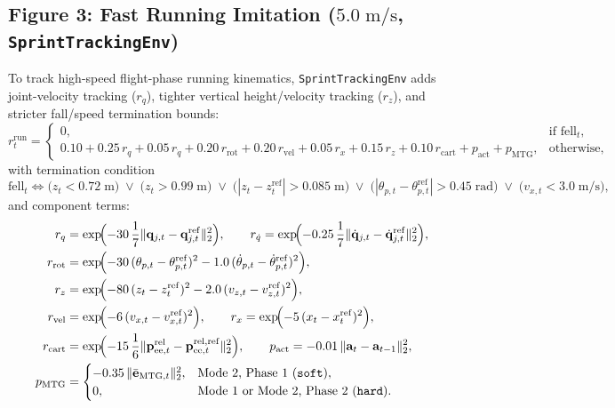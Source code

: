 \subsection*{Figure 3: Fast Running Imitation ($5.0\;\mathrm{m/s}$, \texttt{SprintTrackingEnv})}

To track high-speed flight-phase running kinematics, \texttt{SprintTrackingEnv} adds joint-velocity tracking ($r_{\dot{q}}$), tighter vertical height/velocity tracking ($r_z$), and stricter fall/speed termination bounds:
\begin{equation}
r_t^{\mathrm{run}} =
\begin{cases}
0, & \text{if } \mathrm{fell}_t, \\[6pt]
0.10 + 0.25\,r_q + 0.05\,r_{\dot{q}} + 0.20\,r_{\mathrm{rot}} + 0.20\,r_{\mathrm{vel}} + 0.05\,r_x + 0.15\,r_z + 0.10\,r_{\mathrm{cart}} + p_{\mathrm{act}} + p_{\mathrm{MTG}}, & \text{otherwise},
\end{cases}
\end{equation}
with termination condition
\begin{equation}
\mathrm{fell}_t \iff \bigl(z_t < 0.72\;\mathrm{m}\bigr) \;\lor\; \bigl(z_t > 0.99\;\mathrm{m}\bigr) \;\lor\; \bigl(|z_t - z_t^{\mathrm{ref}}| > 0.085\;\mathrm{m}\bigr) \;\lor\; \bigl(|\theta_{p,t} - \theta_{p,t}^{\mathrm{ref}}| > 0.45\;\mathrm{rad}\bigr) \;\lor\; \bigl(v_{x,t} < 3.0\;\mathrm{m/s}\bigr),
\end{equation}
and component terms:
\begin{align}
r_q &= \exp\!\Bigl(-30\,\frac{1}{7}\lVert \mathbf{q}_{j,t} - \mathbf{q}_{j,t}^{\mathrm{ref}} \rVert_2^2\Bigr), \qquad
r_{\dot{q}} = \exp\!\Bigl(-0.25\,\frac{1}{7}\lVert \dot{\mathbf{q}}_{j,t} - \dot{\mathbf{q}}_{j,t}^{\mathrm{ref}} \rVert_2^2\Bigr), \\
r_{\mathrm{rot}} &= \exp\!\Bigl(-30\,(\theta_{p,t} - \theta_{p,t}^{\mathrm{ref}})^2 - 1.0\,(\dot{\theta}_{p,t} - \dot{\theta}_{p,t}^{\mathrm{ref}})^2\Bigr), \\
r_z &= \exp\!\Bigl(-80\,(z_t - z_t^{\mathrm{ref}})^2 - 2.0\,(v_{z,t} - v_{z,t}^{\mathrm{ref}})^2\Bigr), \\
r_{\mathrm{vel}} &= \exp\!\Bigl(-6\,(v_{x,t} - v_{x,t}^{\mathrm{ref}})^2\Bigr), \qquad
r_x = \exp\!\Bigl(-5\,(x_t - x_t^{\mathrm{ref}})^2\Bigr), \\
r_{\mathrm{cart}} &= \exp\!\Bigl(-15\,\frac{1}{6}\lVert \mathbf{p}_{\mathrm{ee},t}^{\mathrm{rel}} - \mathbf{p}_{\mathrm{ee},t}^{\mathrm{rel,ref}} \rVert_2^2\Bigr), \qquad
p_{\mathrm{act}} = -0.01\,\lVert \mathbf{a}_t - \mathbf{a}_{t-1} \rVert_2^2, \\
p_{\mathrm{MTG}} &=
\begin{cases}
-0.35\,\lVert \bar{\mathbf{e}}_{\mathrm{MTG},t} \rVert_2^2, & \text{Mode 2, Phase 1 (\texttt{soft})}, \\
0, & \text{Mode 1 or Mode 2, Phase 2 (\texttt{hard})}.
\end{cases}
\end{align}
